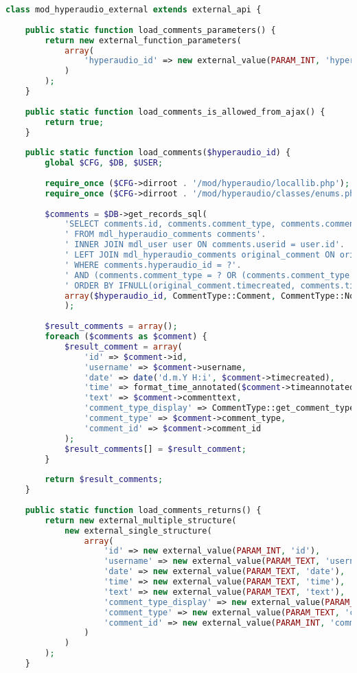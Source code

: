 \begin{lstlisting}[language=php,
             linewidth=\textwidth,
             caption={\textbf{external.php} in der 5. Iteration},
             label={lst:it5:external}]
class mod_hyperaudio_external extends external_api {
    
	public static function load_comments_parameters() {
		return new external_function_parameters(
			array(
				'hyperaudio_id' => new external_value(PARAM_INT, 'hyperaudio_id')
			)
		);
	}
    
	public static function load_comments_is_allowed_from_ajax() {
		return true;
	}
    
	public static function load_comments($hyperaudio_id) {
		global $CFG, $DB, $USER;
        
		require_once ($CFG->dirroot . '/mod/hyperaudio/locallib.php');
		require_once ($CFG->dirroot . '/mod/hyperaudio/classes/enums.php');
        
		$comments = $DB->get_records_sql(
			'SELECT comments.id, comments.comment_type, comments.commenttext, comments.timeannotated, comments.timecreated, user.username, comments.comment_id'.
			' FROM mdl_hyperaudio_comments comments'.
			' INNER JOIN mdl_user user ON comments.userid = user.id'.
			' LEFT JOIN mdl_hyperaudio_comments original_comment ON original_comment.id = comments.comment_id'.
			' WHERE comments.hyperaudio_id = ?'.
			' AND (comments.comment_type = ? OR (comments.comment_type =? AND comments.userid = ?))'.
			' ORDER BY IFNULL(original_comment.timecreated, comments.timecreated)*POWER(10, 11) + comments.timecreated',
			array($hyperaudio_id, CommentType::Comment, CommentType::Note, $USER->id)
			);
        
		$result_comments = array();
		foreach ($comments as $comment) {
			$result_comment = array(
				'id' => $comment->id,
				'username' => $comment->username,
				'date' => date('d.m.Y H:i', $comment->timecreated),
				'time' => format_time_annotated($comment->timeannotated),
				'text' => $comment->commenttext,
				'comment_type_display' => CommentType::get_comment_type($comment->comment_type),
				'comment_type' => $comment->comment_type,
				'comment_id' => $comment->comment_id
			);
			$result_comments[] = $result_comment;
		}
        
		return $result_comments;
    }
    
	public static function load_comments_returns() {
		return new external_multiple_structure(
			new external_single_structure(
				array(
					'id' => new external_value(PARAM_INT, 'id'),
					'username' => new external_value(PARAM_TEXT, 'username'),
					'date' => new external_value(PARAM_TEXT, 'date'),
					'time' => new external_value(PARAM_TEXT, 'time'),
					'text' => new external_value(PARAM_TEXT, 'text'),
					'comment_type_display' => new external_value(PARAM_TEXT, 'comment_type_display'),
					'comment_type' => new external_value(PARAM_TEXT, 'comment_type'),
					'comment_id' => new external_value(PARAM_INT, 'comment_id')
				)
			)
		);
	}


\end{lstlisting}
